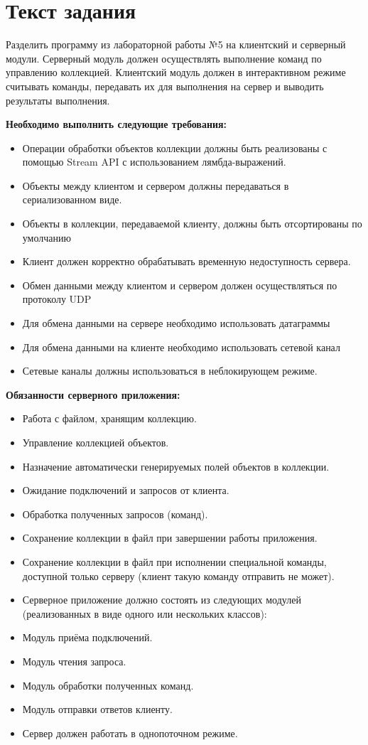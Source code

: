 \section{Текст задания}
Разделить программу из лабораторной работы №5 на клиентский и серверный модули.
Серверный модуль должен осуществлять выполнение команд по управлению коллекцией. 
Клиентский модуль должен в интерактивном режиме считывать команды,
передавать их для выполнения на сервер и выводить результаты выполнения.

\textbf{Необходимо выполнить следующие требования:}
\begin{itemize}
\item Операции обработки объектов коллекции должны быть реализованы с помощью Stream API с использованием лямбда-выражений.
\item Объекты между клиентом и сервером должны передаваться в сериализованном виде.
\item Объекты в коллекции, передаваемой клиенту, должны быть отсортированы по умолчанию
\item Клиент должен корректно обрабатывать временную недоступность сервера.
\item Обмен данными между клиентом и сервером должен осуществляться по протоколу UDP
\item Для обмена данными на сервере необходимо использовать датаграммы
\item Для обмена данными на клиенте необходимо использовать сетевой канал
\item Сетевые каналы должны использоваться в неблокирующем режиме.
\end{itemize}

\textbf{Обязанности серверного приложения:}

\begin{itemize}
\item Работа с файлом, хранящим коллекцию.
\item Управление коллекцией объектов.
\item Назначение автоматически генерируемых полей объектов в коллекции.
\item Ожидание подключений и запросов от клиента.
\item Обработка полученных запросов (команд).
\item Сохранение коллекции в файл при завершении работы приложения.
\item Сохранение коллекции в файл при исполнении специальной команды, доступной только серверу (клиент такую команду отправить не может).
\item Серверное приложение должно состоять из следующих модулей (реализованных в виде одного или нескольких классов):
\item Модуль приёма подключений.
\item Модуль чтения запроса.
\item Модуль обработки полученных команд.
\item Модуль отправки ответов клиенту.
\item Сервер должен работать в однопоточном режиме.
\end{itemize}

